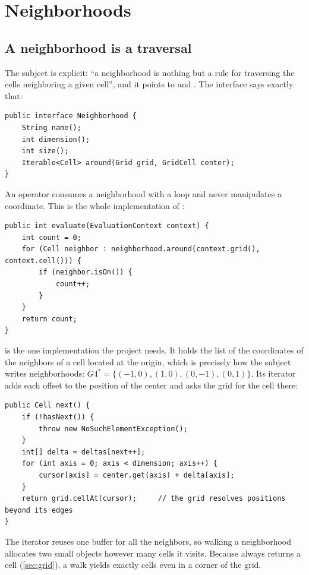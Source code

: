 \section{Neighborhoods}
\label{sec:neighborhoods}

\subsection{A neighborhood is a traversal}

The subject is explicit: ``a neighborhood is nothing but a rule for traversing the cells
neighboring a given cell'', and it points to  and . The interface
says exactly that:

\begin{lstlisting}
public interface Neighborhood {
    String name();
    int dimension();
    int size();
    Iterable<Cell> around(Grid grid, GridCell center);
}
\end{lstlisting}

An operator consumes a neighborhood with a  loop and never manipulates a coordinate.
This is the whole implementation of :

\begin{lstlisting}
public int evaluate(EvaluationContext context) {
    int count = 0;
    for (Cell neighbor : neighborhood.around(context.grid(), context.cell())) {
        if (neighbor.isOn()) {
            count++;
        }
    }
    return count;
}
\end{lstlisting}

 is the one implementation the project needs. It holds the list of the
coordinates of the neighbors of a cell located at the origin, which is precisely how the subject
writes neighborhoods: $G4^* = \{(-1, 0), (1, 0), (0, -1), (0, 1)\}$. Its iterator adds each
offset to the position of the center and asks the grid for the cell there:

\begin{lstlisting}
public Cell next() {
    if (!hasNext()) {
        throw new NoSuchElementException();
    }
    int[] delta = deltas[next++];
    for (int axis = 0; axis < dimension; axis++) {
        cursor[axis] = center.get(axis) + delta[axis];
    }
    return grid.cellAt(cursor);     // the grid resolves positions beyond its edges
}
\end{lstlisting}

The iterator reuses one buffer for all the neighbors, so walking a neighborhood allocates two
small objects however many cells it visits. Because  always returns a cell
(\cref{sec:grid}), a walk yields exactly  cells even in a corner of the grid.

